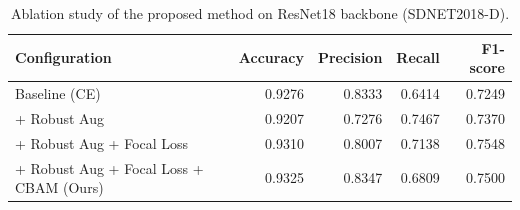 \begin{table}
\caption{Ablation study of the proposed method on ResNet18 backbone (SDNET2018-D).}
\label{tab:ablation}
\begin{tabular}{lrrrr}
\toprule
Configuration & Accuracy & Precision & Recall & F1-score \\
\midrule
Baseline (CE) & 0.9276 & 0.8333 & 0.6414 & 0.7249 \\
+ Robust Aug & 0.9207 & 0.7276 & 0.7467 & 0.7370 \\
+ Robust Aug + Focal Loss & 0.9310 & 0.8007 & 0.7138 & 0.7548 \\
+ Robust Aug + Focal Loss + CBAM (Ours) & 0.9325 & 0.8347 & 0.6809 & 0.7500 \\
\bottomrule
\end{tabular}
\end{table}

